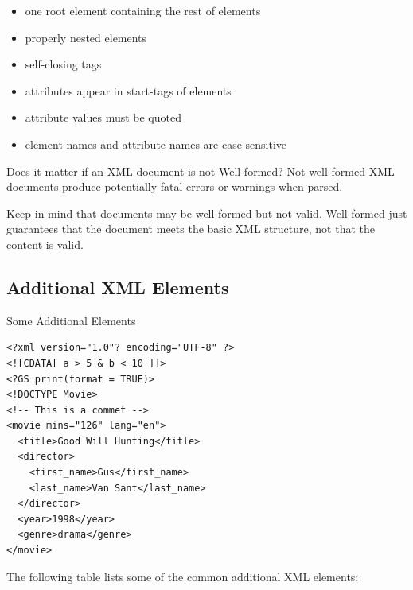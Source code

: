 \documentclass[
]{book}
\providecommand{\tightlist}{%
  \setlength{\itemsep}{0pt}\setlength{\parskip}{0pt}}
\begin{document}
\begin{itemize}
\tightlist
\item
  one root element containing the rest of elements
\item
  properly nested elements
\item
  self-closing tags
\item
  attributes appear in start-tags of elements
\item
  attribute values must be quoted
\item
  element names and attribute names are case sensitive
\end{itemize}

Does it matter if an XML document is not Well-formed? Not well-formed XML
documents produce potentially fatal errors or warnings when parsed.

Keep in mind that documents may be well-formed but not valid. Well-formed just
guarantees that the document meets the basic XML structure, not that the content
is valid.

\hypertarget{additional-xml-elements}{%
\subsection{Additional XML Elements}\label{additional-xml-elements}}

Some Additional Elements

\begin{verbatim}
<?xml version="1.0"? encoding="UTF-8" ?>
<![CDATA[ a > 5 & b < 10 ]]>
<?GS print(format = TRUE)>
<!DOCTYPE Movie>
<!-- This is a commet -->
<movie mins="126" lang="en">
  <title>Good Will Hunting</title>
  <director>
    <first_name>Gus</first_name>
    <last_name>Van Sant</last_name>
  </director>
  <year>1998</year>
  <genre>drama</genre>
</movie>
\end{verbatim}

The following table lists some of the common additional XML elements:
\end{document}

